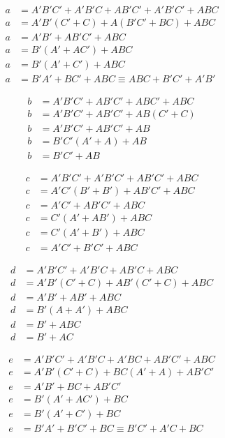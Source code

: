 \documentclass[
	article,			%
	11pt,				%
	oneside,			%
	a4paper,			%
	english,			%
	brazil,				%
	sumario=tradicional
	]{abntex2}
\begin{document}
\begin{equation}
\begin{split}
a &= A'B'C' + A'B'C + AB'C' + A'B'C' + ABC \\
a &= A'B'(C'+ C) + A(B'C' + BC) + ABC\\
a &= A'B' + AB'C' + ABC\\
a &= B'(A' + AC') + ABC\\
a &= B'(A' + C') + ABC\\
a &= B'A' + BC' + ABC \equiv ABC + B'C' + A'B'
\label{math:display-a}
\end{split}
\end{equation}

\begin{equation}
\begin{split}
b &= A'B'C' + AB'C' + ABC' + ABC  \\
b &= A'B'C' + AB'C' + AB(C' + C)\\
b &= A'B'C' + AB'C' + AB\\
b &= B'C'(A' + A) + AB\\
b &= B'C' + AB
\label{math:display-b}
\end{split}
\end{equation}

\begin{equation}
\begin{split}
c &= A'B'C' + A'B'C' + AB'C' + ABC \\
c &= A'C'(B' + B') + AB'C' + ABC \\
c &= A'C' + AB'C' + ABC \\
c &= C'(A' + AB') + ABC \\
c &= C'(A' + B') + ABC \\
c &= A'C' + B'C' + ABC
\label{math:display-c}
\end{split}
\end{equation}

\begin{equation}
\begin{split}
d &= A'B'C' + A'B'C + AB'C + ABC\\
d &= A'B'(C' + C) + AB'(C' + C) + ABC\\
d &= A'B' + AB' + ABC\\
d &= B'(A + A') + ABC\\
d &= B' + ABC\\
d &= B' + AC
\label{math:display-d}
\end{split}
\end{equation}

\begin{equation}
\begin{split}
e &= A'B'C' + A'B'C + A'BC + AB'C' + ABC\\
e &= A'B'(C' + C) + BC(A' + A) + AB'C'\\
e &= A'B' + BC + AB'C'\\
e &= B'(A' + AC') + BC\\
e &= B'(A' + C') + BC\\
e &= B'A' + B'C' + BC \equiv B'C' + A'C + BC
\label{math:display-e}
\end{split}
\end{equation}
\end{document}

